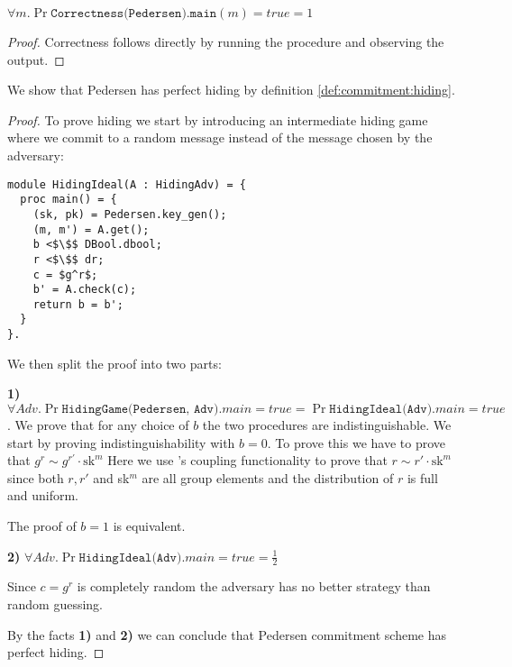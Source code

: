 \begin{lemma}
  $\forall m.\Pr{\texttt{Correctness(Pedersen).main}(m) = true} = 1$
\end{lemma}
\begin{proof}
  Correctness follows directly by running the procedure and observing the output.
\end{proof}

\begin{lemma}
  We show that Pedersen has perfect hiding by definition
  \ref{def:commitment:hiding}.
\end{lemma}
\begin{proof}
  To prove hiding we start by introducing an intermediate hiding game where we
  commit to a random message instead of the message chosen by the adversary:
\begin{lstlisting}[mathescape]
module HidingIdeal(A : HidingAdv) = {
  proc main() = {
    (sk, pk) = Pedersen.key_gen();
    (m, m') = A.get();
    b <$\$$ DBool.dbool;
    r <$\$$ dr;
    c = $g^r$;
    b' = A.check(c);
    return b = b';
  }
}.
\end{lstlisting}
  We then split the proof into two parts:

  \noindent\textbf{1) }
  $\forall Adv. \Pr{\texttt{HidingGame(Pedersen, Adv)}.main = true} = \Pr{\texttt{HidingIdeal(Adv)}.main = true}$.
  We prove that for any choice of $b$ the two procedures are
  indistinguishable. We start by proving indistinguishability with $b = 0$.
  To prove this we have to prove that $g^{r} \sim g^{r'} \cdot \text{sk}^{m}$
  Here we use \easycrypt's coupling functionality to prove that
  $r \sim r' \cdot \text{sk}^{m}$ since both $r, r'$ and sk$^{m}$ are all group
  elements and the distribution of $r$ is full and uniform.

  The proof of $b = 1$ is equivalent.

  \noindent \textbf{2)}
  $\forall Adv. \Pr{\texttt{HidingIdeal(Adv)}.main = true} = \frac{1}{2}$

  Since $c = g^{r}$ is completely random the adversary has no better strategy
  than random guessing.


  By the facts \textbf{1)} and \textbf{2)} we can conclude that Pedersen
  commitment scheme has perfect hiding.
\end{proof}

